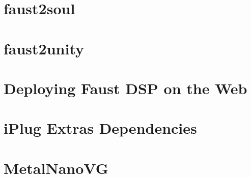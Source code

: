 \let\mypdfximage\pdfximage\def\pdfximage{\immediate\mypdfximage}\documentclass[twoside]{book}
\newcommand{\+}{\discretionary{\mbox{\scriptsize$\hookleftarrow$}}{}{}}
\begin{document}
\chapter{faust2soul}
\label{md__c_1__users_fab_src__github_branches__neural_amp_modeler_plugin_i_plug2__dependencies__build_d1bc5496d4d715a0b88ab91a9ef53bdb}

\chapter{faust2unity}
\label{md__c_1__users_fab_src__github_branches__neural_amp_modeler_plugin_i_plug2__dependencies__build_e85500032a5dec5d8c0d0de2b35652f6}

\chapter{Deploying Faust D\+SP on the Web}
\label{md__c_1__users_fab_src__github_branches__neural_amp_modeler_plugin_i_plug2__dependencies__build_88334876732ac68e3ec9b4662df005e5}

\chapter{i\+Plug Extras Dependencies}
\label{md__c_1__users_fab_src__github_branches__neural_amp_modeler_plugin_i_plug2__dependencies__extras__r_e_a_d_m_e}

\chapter{Metal\+Nano\+VG}
\label{md__c_1__users_fab_src__github_branches__neural_amp_modeler_plugin_i_plug2__dependencies__i_grap10318468432387918557f5f2d67ab25b}

\end{document}
